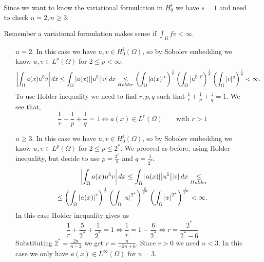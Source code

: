 Since we want to know the variational formulation in \(H^1_0\) we have \(s =
1\) and need to check \(n = 2, n \geq 3\).

Remember a variational formulation makes sense if \(\int_\Omega fv < \infty\).
\begin{itemize}
    \item[\(n = 2\).] In this case we have \(u, v \in H^1_0(\Omega)\), so by Sobolev embedding we know \(u, v \in L^p(\Omega)\) for \(2 \leq p < \infty\).
          \[
              \abs{\int_\Omega a(x) u^5 v}  \, dx \leq \int_\Omega \abs{a(x)} \abs{u^5} \abs{v} \, dx \underset{Holder}{\leq} \left(\int_\Omega \abs{a(x)}^r\right)^{\frac{1}{r}} \left(\int_\Omega \abs{u^5}^p \right)^{\frac{1}{p}} \left(\int_\Omega \abs{v}^q \right)^{\frac{1}{q}} < \infty.
          \]
          To use Holder inequality we need to find \(r, p, q\) such that \(\frac{1}{r} +
          \frac{1}{p} + \frac{1}{q} = 1\). We see that,
          \[
              \frac{1}{r} + \frac{1}{p} + \frac{1}{q} = 1 \iff a(x) \in L^r(\Omega) \qquad \text{with } r > 1
          \]
    \item[\(n \geq 3\).] In this case we have \(u, v \in H^1_0(\Omega)\), so by Sobolev embedding we know \(u, v \in L^p(\Omega)\) for \(2 \leq p \leq 2^*\).
          We proceed as before, using Holder inequality, but decide to use \(p = \frac{2^*}{5}\) and \(q = \frac{1}{2^*}.\)
          \[
              \begin{split}
                  \abs{\int_\Omega a(x) u^5 v}  \, dx \leq \int_\Omega \abs{a(x)} \abs{u^5} \abs{v} \, dx \underset{{Holder}}{\leq} \\
                  \leq \left(\int_\Omega \abs{a(x)}^r\right)^{\frac{1}{r}} \left(\int_\Omega \abs{u}^{2^*} \right)^{\frac{5}{2^*}} \left(\int_\Omega \abs{v}^{2^*} \right)^{\frac{1}{2^*}} < \infty.
              \end{split}
          \]
          In this case Holder inequality gives us
          \[
              \frac{1}{r} + \frac{5}{2^*} + \frac{1}{2^*} = 1 \iff \frac{1}{r} = 1 - \frac{6}{2^*} \iff r = \frac{2^*}{2^*-6}
          \]
          Substituting \(2^* = \frac{2n}{n - 2}\) we get \(r = \frac{n}{-2n + 6}\). Since
          \(r > 0\) we need \(n < 3\). In this case we only have \(a(x) \in
          L^\infty(\Omega)\) for \(n = 3\).
\end{itemize}
\newpage

